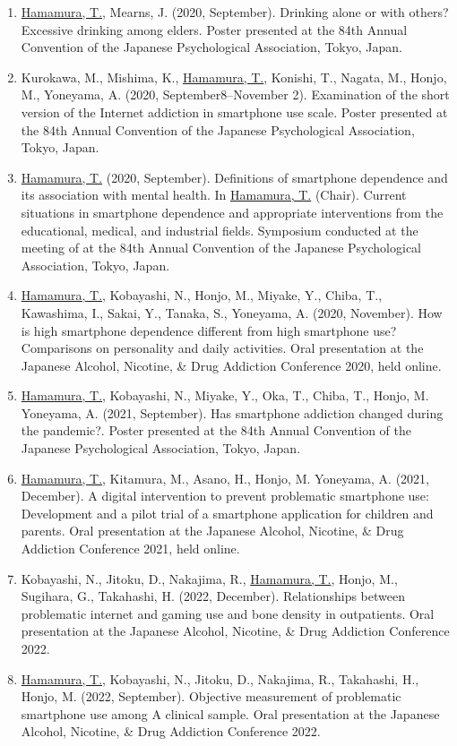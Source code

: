 \documentclass[a4paper]{article}
\begin{document}
\begin{enumerate}
	\item \underline{Hamamura, T.}, Mearns, J. (2020, September). Drinking alone or with others? Excessive drinking among elders. Poster presented at the 84th Annual Convention of the Japanese Psychological Association, Tokyo, Japan.
	\item Kurokawa, M., Mishima, K., \underline{Hamamura, T.}, Konishi, T., Nagata, M., Honjo, M., Yoneyama, A. (2020, September8--November 2). Examination of the short version of the Internet addiction in smartphone use scale. Poster presented at the 84th Annual Convention of the Japanese Psychological Association, Tokyo, Japan.
	\item \underline{Hamamura, T.} (2020, September).  Definitions of smartphone dependence and its association with mental health.	In \underline{Hamamura, T.} (Chair). Current situations in smartphone dependence and appropriate interventions from the educational, medical, and industrial fields. Symposium conducted at the meeting of at the 84th Annual Convention of the Japanese Psychological Association, Tokyo, Japan.
	\item \underline{Hamamura, T.}, Kobayashi, N., Honjo, M., Miyake, Y., Chiba, T., Kawashima, I., Sakai, Y., Tanaka, S., Yoneyama, A. (2020, November). How is high smartphone dependence different from high smartphone use? Comparisons on personality and daily activities. Oral presentation at the Japanese Alcohol, Nicotine, \& Drug Addiction Conference 2020, held online.
	\item \underline{Hamamura, T.}, Kobayashi, N., Miyake, Y., Oka, T., Chiba, T., Honjo, M. Yoneyama, A. (2021, September). Has smartphone addiction changed during the pandemic?. Poster presented at the 84th Annual Convention of the Japanese Psychological Association, Tokyo, Japan.
	\item \underline{Hamamura, T.}, Kitamura, M., Asano, H., Honjo, M. Yoneyama, A. (2021, December). A digital intervention to prevent problematic smartphone use: Development and a pilot trial of a smartphone application for children and parents. Oral presentation at the Japanese Alcohol, Nicotine, \& Drug Addiction Conference 2021, held online.
	\item Kobayashi, N., Jitoku, D., Nakajima, R., \underline{Hamamura, T.}, Honjo, M., Sugihara, G., Takahashi, H. (2022, December). Relationships between problematic internet and gaming use and bone density in outpatients. Oral presentation at the Japanese Alcohol, Nicotine, \& Drug Addiction Conference 2022.
	\item \underline{Hamamura, T.}, Kobayashi, N., Jitoku, D., Nakajima, R., Takahashi, H., Honjo, M. (2022, September). Objective measurement of problematic smartphone use among A clinical sample. Oral presentation at the Japanese Alcohol, Nicotine, \& Drug Addiction Conference 2022.

\end{enumerate}
\end{document}
